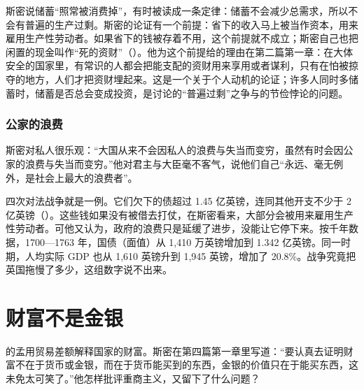\begin{pitfall}[省下来的钱一定会被花掉]
斯密说储蓄“照常被消费掉”，有时被读成一条定律：储蓄不会减少总需求，所以不会有普遍的生产过剩。斯密的论证有一个前提：省下的收入马上被当作资本，用来雇用生产性劳动者。如果省下的钱被存着不用，这个前提就不成立；斯密自己也把闲置的现金叫作“死的资财”（）。他为这个前提给的理由在第二篇第一章：在大体安全的国家里，有常识的人都会把能支配的资财用来享用或者谋利，只有在怕被掠夺的地方，人们才把资财埋起来\cite{smith1776}。这是一个关于个人动机的论证；许多人同时多储蓄时，储蓄是否总会变成投资，是讨论的“普遍过剩”之争与的节俭悖论的问题。
\end{pitfall}

\subsubsection{公家的浪费}
斯密对私人很乐观：“大国从来不会因私人的浪费与失当而变穷，虽然有时会因公家的浪费与失当而变穷。”\cite{smith1776}他对君主与大臣毫不客气，说他们自己“永远、毫无例外，是社会上最大的浪费者”\cite{smith1776}。

四次对法战争就是一例。它们欠下的债超过 1.45 亿英镑，连同其他开支不少于 2 亿英镑（）。这些钱如果没有被借去打仗，在斯密看来，大部分会被用来雇用生产性劳动者。可他又认为，政府的浪费只是延缓了进步，没能让它停下来。按千年数据，1700—1763 年，国债（面值）从 1,410 万英镑增加到 1.342 亿英镑。同一时期，人均实际 GDP 也从 1,610 英镑升到 1,945 英镑，增加了 20.8\%\cite{boe2017,broadberry2015}。战争究竟把英国拖慢了多少，这组数字说不出来。


\section{财富不是金银}\label{sec:smith-mercantile}

的孟用贸易差额解释国家的财富。斯密在第四篇第一章里写道：“要认真去证明财富不在于货币或金银，而在于货币能买到的东西，金银的价值只在于能买东西，这未免太可笑了。”\cite{smith1776}他怎样批评重商主义，又留下了什么问题？

